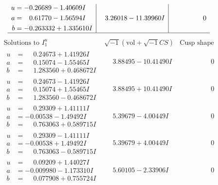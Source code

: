 \documentclass[1p]{elsarticle_modified}
\theoremstyle{definition}
\newcommand{\I}{\sqrt{-1}}
\begin{document}
$$\begin{array}{c|c|c}
\begin{aligned}
u &= -0.26689 - 1.40609 I \\
a &= \phantom{-}0.61770 - 1.56594 I \\
b &= -0.263332 + 1.335610 I\end{aligned}
 & \phantom{-}3.26018 - 11.39960 I & \phantom{-0.000000 } 0\\
 \hline 
 \end{array}$$\newpage$$\begin{array}{c|c|c}  
\text{Solutions to }I^u_{1}& \I (\text{vol} + \sqrt{-1}CS) & \text{Cusp shape}\\
 \hline 
\begin{aligned}
u &= \phantom{-}0.24673 + 1.41926 I \\
a &= \phantom{-}0.15074 - 1.55465 I \\
b &= \phantom{-}1.283560 + 0.468672 I\end{aligned}
 & \phantom{-}3.88495 - 10.41490 I & \phantom{-0.000000 } 0 \\ \hline\begin{aligned}
u &= \phantom{-}0.24673 - 1.41926 I \\
a &= \phantom{-}0.15074 + 1.55465 I \\
b &= \phantom{-}1.283560 - 0.468672 I\end{aligned}
 & \phantom{-}3.88495 + 10.41490 I & \phantom{-0.000000 } 0 \\ \hline\begin{aligned}
u &= \phantom{-}0.29309 + 1.41111 I \\
a &= -0.00538 - 1.49492 I \\
b &= \phantom{-}0.763063 + 0.589715 I\end{aligned}
 & \phantom{-}5.39679 - 4.00449 I & \phantom{-0.000000 } 0 \\ \hline\begin{aligned}
u &= \phantom{-}0.29309 - 1.41111 I \\
a &= -0.00538 + 1.49492 I \\
b &= \phantom{-}0.763063 - 0.589715 I\end{aligned}
 & \phantom{-}5.39679 + 4.00449 I & \phantom{-0.000000 } 0 \\ \hline\begin{aligned}
u &= \phantom{-}0.09209 + 1.44027 I \\
a &= -0.009980 - 1.173310 I \\
b &= \phantom{-}0.077908 + 0.755724 I\end{aligned}
 & \phantom{-}5.60105 - 2.33906 I & \phantom{-0.000000 } 0 \\ \hline\begin{aligned}

\end{aligned}
\end{array}$$
\end{document}
